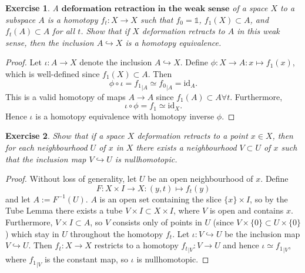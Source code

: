 \documentclass{article}
\newtheorem{exercise}{Exercise}[subsection]
\begin{document}
\begin{exercise}
A $\textbf{deformation retraction in the weak sense}$ of a space $X$ to a subspace $A$ is a homotopy $f_t:X\to X$ such that $f_0=\mathbb{1}$, $f_1(X)\subset A$, and $f_t(A)\subset A$ for all $t$. Show that if $X$ deformation retracts to $A$ in this weak sense, then the inclusion $A\hookrightarrow X$ is a homotopy equivalence.
\end{exercise}
\begin{proof}
Let $\iota:A\to X$ denote the inclusion $A\hookrightarrow X$. Define $\phi:X\to A:x\mapsto f_1(x)$, which is well-defined since $f_1(X)\subset A$. Then \[\phi\circ\iota={f_1}_{|A}\simeq {f_0}_{|A}=\text{id}_A.\]This is a valid homotopy of maps $A\to A$ since $f_1(A)\subset A\forall t$. Furthermore,\[\iota\circ\phi=f_1\simeq\text{id}_X.\] Hence $\iota$ is a homotopy equivalence with homotopy inverse $\phi$.
\end{proof}

\begin{exercise}
Show that if a space $X$ deformation retracts to a point $x\in X$, then for each neighbourhood $U$ of $x$ in $X$ there exists a neighbourhood $V\subset U$ of $x$ such that the inclusion map $V\hookrightarrow U$ is nullhomotopic.
\end{exercise}
\begin{proof}
Without loss of generality, let $U$ be an open neighbourhood of $x$. Define \[F:X\times I\to X:(y,t)\mapsto f_t(y)\] and let $A:=F^{-1}(U)$. $A$ is an open set containing the slice $\{x\}\times I$, so by the Tube Lemma there exists a tube $V\times I\subset X\times I$, where $V$ is open and contains $x$. Furthermore, $V\times I\subset A$, so $V$ consists only of points in $U$ (since $V\times\{0\}\subset U\times\{0\}$) which stay in $U$ throughout the homotopy $f_t$. Let $\iota:V\hookrightarrow U$ be the inclusion map $V\hookrightarrow U$. Then $f_t:X\to X$ restricts to a homotopy ${f_t}_{|V}:V\to U$ and hence $\iota\simeq {f_1}_{|V}$, where ${f_1}_{|V}$ is the constant map, so $\iota$ is nullhomotopic.
\end{proof}
\end{document}

